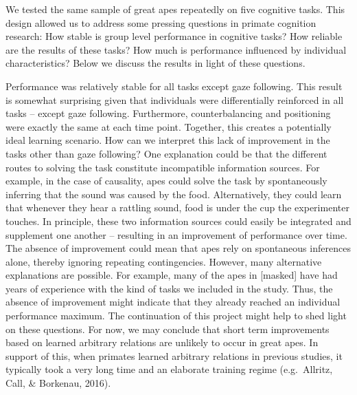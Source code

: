 \documentclass[10pt, letterpaper]{article}
\begin{document}
We tested the same sample of great apes repeatedly on five cognitive
tasks. This design allowed us to address some pressing questions in
primate cognition research: How stable is group level performance in
cognitive tasks? How reliable are the results of these tasks? How much
is performance influenced by individual characteristics? Below we
discuss the results in light of these questions.

Performance was relatively stable for all tasks except gaze following.
This result is somewhat surprising given that individuals were
differentially reinforced in all tasks -- except gaze following.
Furthermore, counterbalancing and positioning were exactly the same at
each time point. Together, this creates a potentially ideal learning
scenario. How can we interpret this lack of improvement in the tasks
other than gaze following? One explanation could be that the different
routes to solving the task constitute incompatible information sources.
For example, in the case of causality, apes could solve the task by
spontaneously inferring that the sound was caused by the food.
Alternatively, they could learn that whenever they hear a rattling
sound, food is under the cup the experimenter touches. In principle,
these two information sources could easily be integrated and supplement
one another -- resulting in an improvement of performance over time. The
absence of improvement could mean that apes rely on spontaneous
inferences alone, thereby ignoring repeating contingencies. However,
many alternative explanations are possible. For example, many of the
apes in {[}masked{]} have had years of experience with the kind of tasks
we included in the study. Thus, the absence of improvement might
indicate that they already reached an individual performance maximum.
The continuation of this project might help to shed light on these
questions. For now, we may conclude that short term improvements based
on learned arbitrary relations are unlikely to occur in great apes. In
support of this, when primates learned arbitrary relations in previous
studies, it typically took a very long time and an elaborate training
regime (e.g.~Allritz, Call, \& Borkenau, 2016).
\end{document}
